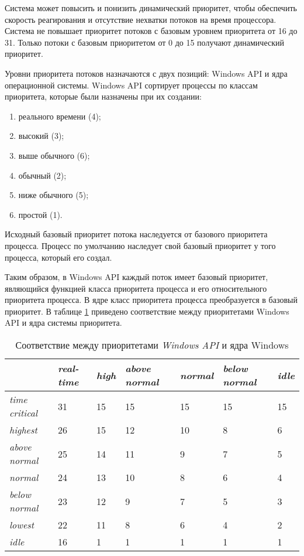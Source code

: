 Система может повысить и понизить динамический приоритет, чтобы обеспечить скорость реагирования и отсутствие нехватки потоков на время 
процессора. Система не повышает приоритет потоков с базовым уровнем приоритета от 16 до 31. Только потоки с базовым приоритетом от 0 до 
15 получают динамический приоритет.

Уровни приоритета потоков назначаются с двух позиций: Windows API и ядра операционной системы. Windows API сортирует процессы по классам 
приоритета, которые были назначены при их создании:
\begin{enumerate}
	\item реального времени (4);
	\item высокий (3);
	\item выше обычного (6);
	\item обычный (2);
	\item ниже обычного (5); 
	\item простой (1).
\end{enumerate}

Исходный базовый приоритет потока наследуется от базового приоритета процесса. Процесс по умолчанию наследует свой базовый приоритет у того 
процесса, который его создал.

Таким образом, в Windows API каждый поток имеет базовый приоритет, являющийся функцией класса приоритета процесса и его относительного 
приоритета процесса. В ядре класс приоритета процесса преобразуется в базовый приоритет. В таблице \ref{tbl:priority} приведено соответствие 
между приоритетами Windows API и ядра системы приоритета.

\begin{table}[h]
    \caption{Соответствие между приоритетами \textit{Windows API} и ядра Windows}
    \begin{center}
        \begin{tabular}{|l|p{45pt}|p{45pt}|p{45pt}|p{45pt}|p{45pt}|p{45pt}|}
            \hline
            {} & \textit{real-time} & \textit{high} & \textit{above normal} & \textit{normal} & \textit{below normal} & \textit{idle}\\
            \hline
            \textit{time critical} & 31 & 15 & 15 & 15 & 15 & 15 \\
            \hline
            \textit{highest} & 26 & 15 & 12 & 10 & 8 & 6 \\
            \hline
            \textit{above normal} & 25 & 14 & 11 & 9 & 7 & 5 \\
            \hline
            \textit{normal} & 24 & 13 & 10 & 8 & 6 & 4 \\
            \hline
            \textit{below normal} & 23 & 12 & 9 & 7 & 5 & 3 \\
            \hline
            \textit{lowest} & 22 & 11 & 8 & 6 & 4 & 2 \\
            \hline
            \textit{idle} & 16 & 1 & 1 & 1 & 1 & 1 \\
            \hline
        \end{tabular}
    \end{center}
    \label{tbl:priority}
\end{table}

